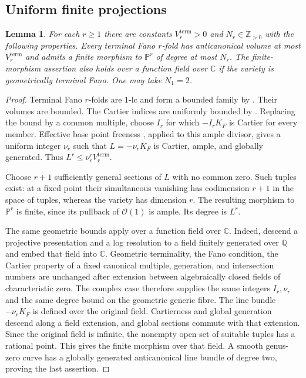 \documentclass[11pt,reqno]{amsart}
\numberwithin{equation}{section}
\newtheorem{lemma}[theorem]{Lemma}
\theoremstyle{definition}
\theoremstyle{remark}
\newcommand{\Q}{\mathbb Q}
\newcommand{\C}{\mathbb C}
\newcommand{\Z}{\mathbb Z}
\newcommand{\PP}{\mathbb P}
\newcommand{\OO}{\mathcal O}
\begin{document}
\subsection{Uniform finite projections}
\begin{lemma}\label{lem:projections}
For each $r\ge1$ there are constants $V_r^{\mathrm{term}}>0$ and $N_r\in\Z_{>0}$ with the following properties. Every terminal Fano $r$-fold has anticanonical volume at most $V_r^{\mathrm{term}}$ and admits a finite morphism to $\PP^r$ of degree at most $N_r$. The finite-morphism assertion also holds over a function field over $\C$ if the variety is geometrically terminal Fano. One may take $N_1=2$.
\end{lemma}
\begin{proof}
Terminal Fano $r$-folds are $1$-lc and form a bounded family by \cite[Theorem~1.1]{Bir21}. Their volumes are bounded. The Cartier indices are uniformly bounded by \cite[Theorem~1.2]{HJ25}. Replacing the bound by a common multiple, choose $I_r$ for which $-I_rK_F$ is Cartier for every member. Effective base point freeness \cite{Kol93}, applied to this ample divisor, gives a uniform integer $\nu_r$ such that $L=-\nu_rK_F$ is Cartier, ample, and globally generated. Thus $L^r\le\nu_r^r V_r^{\mathrm{term}}$.

Choose $r+1$ sufficiently general sections of $L$ with no common zero. Such tuples exist: at a fixed point their simultaneous vanishing has codimension $r+1$ in the space of tuples, whereas the variety has dimension $r$. The resulting morphism to $\PP^r$ is finite, since its pullback of $\OO(1)$ is ample. Its degree is $L^r$.

The same geometric bounds apply over a function field over $\C$. Indeed, descend a projective presentation and a log resolution to a field finitely generated over $\Q$ and embed that field into $\C$. Geometric terminality, the Fano condition, the Cartier property of a fixed canonical multiple, generation, and intersection numbers are unchanged after extension between algebraically closed fields of characteristic zero. The complex case therefore supplies the same integers $I_r,\nu_r$ and the same degree bound on the geometric generic fibre. The line bundle $-\nu_rK_F$ is defined over the original field. Cartierness and global generation descend along a field extension, and global sections commute with that extension. Since the original field is infinite, the nonempty open set of suitable tuples has a rational point. This gives the finite morphism over that field. A smooth genus-zero curve has a globally generated anticanonical line bundle of degree two, proving the last assertion.
\end{proof}
\end{document}
